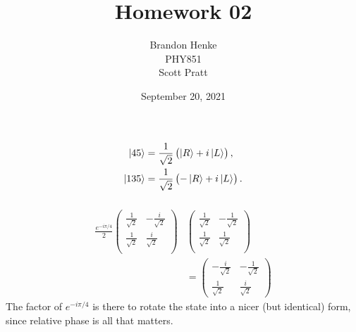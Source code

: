 \documentclass[a4paper,12pt,twoside]{article}
\title{Homework 02}
\author{Brandon Henke\\PHY851\\Scott Pratt}
\date{September 20, 2021}
\begin{document}

\maketitle

\setcounter{subsection}{9}
\subsection{}%
\subsubsection{}
\begin{align}
	\ket{45} &= \frac{1}{\sqrt{2}} \left( \ket{R} + i\ket{L} \right),\\
	\ket{135} &= \frac{1}{\sqrt{2}} \left( -\ket{R} + i\ket{L} \right).
\end{align}
\subsubsection{}
\begin{align}
	\frac{e^{-i\pi/4}}{2} \begin{pmatrix}
		\frac{1}{\sqrt{2}} & -\frac{i}{\sqrt{2}} \\
		\frac{1}{\sqrt{2}} & \frac{i}{\sqrt{2}} \\
	\end{pmatrix}&
	\begin{pmatrix}
		\frac{1}{\sqrt{2}} & -\frac{1}{\sqrt{2}} \\
		\frac{1}{\sqrt{2}} & \frac{1}{\sqrt{2}} \\
	\end{pmatrix}\nonumber\\
	&=
	\begin{pmatrix}
		-\frac{i}{\sqrt{2}} & -\frac{1}{\sqrt{2}} \\
		\frac{1}{\sqrt{2}} & \frac{i}{\sqrt{2}}
	\end{pmatrix}
\end{align}
The factor of $e^{-i\pi/4}$ is there to rotate the state into a nicer (but identical) form, since relative phase is all that matters.
\end{document}
